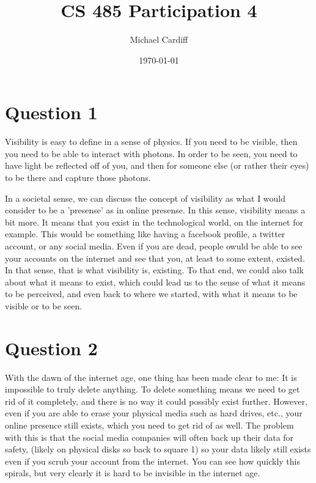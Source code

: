\documentclass[12pt]{article}
\title{\vspace{-3em}CS 485 Participation 4}
\author{Michael Cardiff}
\date{\today}
\begin{document}
\maketitle
\section*{Question 1}
Visibility is easy to define in a sense of physics. If you need to be visible, then you need to be able to interact with photons. In order to be seen, you need to have light be reflected off of you, and then for someone else (or rather their eyes) to be there and capture those photons.

In a societal sense, we can discuss the concept of visibility as what I would consider to be a 'presense' as in online presense. In this sense, visibility means a bit more. It means that you exist in the technological world, on the internet for example. This would be something like having a facebook profile, a twitter account, or any social media. Even if you are dead, people owuld be able to see your accounts on the internet and see that you, at least to some extent, existed. In that sense, that is what visibility is, existing. To that end, we could also talk about what it means to exist, which could lead us to the sense of what it means to be perceived, and even back to where we started, with what it means to be visible or to be seen. 
\section*{Question 2}
With the dawn of the internet age, one thing has been made clear to me: It is impossible to truly delete anything. To delete something means we need to get rid of it completely, and there is no way it could possibly exist further. However, even if you are able to erase your physical media such as hard drives, etc., your online presence still exists, which you need to get rid of as well. The problem with this is that the social media companies will often back up their data for safety, (likely on physical disks so back to square 1) so your data likely still exists even if you scrub your account from the internet. You can see how quickly this spirals, but very clearly it is hard to be invisible in the internet age. 
\end{document}
